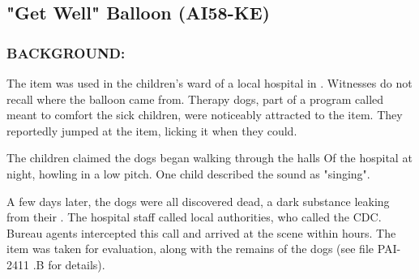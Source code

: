 \subsection*{"Get Well" Balloon (AI58-KE)}
\subsubsection*{BACKGROUND:}
\par The item was used in the children's ward of a local hospital in . Witnesses do not recall where the balloon came
from. Therapy dogs, part of a program called 
meant to comfort the sick children, were noticeably attracted to
the item. They reportedly jumped at the item, licking it when they
could.
\par The children claimed the dogs began walking through the halls Of
the hospital at night, howling in a low pitch. One child described
the sound as "singing".
\par A few days later, the dogs were all discovered dead, a dark
substance leaking from their . The hospital staff
called local authorities, who called the CDC. Bureau agents
intercepted this call and arrived at the scene within 
hours.
The item was taken for evaluation, along with the remains of the
dogs (see file PAI-2411 .B for details).